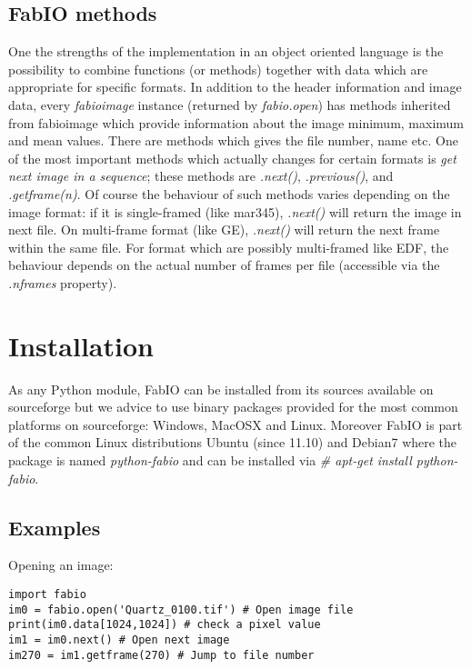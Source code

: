 \documentclass[preprint ]{iucr}
\begin{document}
\subsection{FabIO methods}



One the strengths of the implementation in an object oriented language
is the possibility to combine functions (or methods) together with data which
are appropriate for specific formats.
In addition to the header information and image data, every {\em fabioimage}
instance (returned by {\em fabio.open}) has methods inherited from fabioimage 
which provide information about the image minimum, maximum and mean values.
There are methods which gives the file number, name etc. One of the most
important methods which actually changes for certain formats  is {\em get next image
in a sequence}; these methods are {\em .next()}, {\em .previous()}, and {\em
.getframe(n)}. Of course the behaviour of such methods varies depending on the
image format: if it is single-framed (like mar345),  {\em .next()} will
return the image in next file. On multi-frame format (like GE), {\em .next()} will
return the next frame within the same file. For format which are possibly multi-framed like
EDF, the behaviour depends on the actual number of frames per file (accessible
via the {\em .nframes} property).


\section{Installation}

As any Python module, FabIO can be installed from its sources available on 
sourceforge \cite{fabio} but we advice to use binary packages provided for the
most common platforms on sourceforge: Windows, MacOSX and Linux.
Moreover FabIO is part of the common Linux distributions Ubuntu (since 11.10)
and Debian7 where the package is named {\em python-fabio} and can be installed
via {\em \# apt-get install python-fabio}. 

\subsection{Examples}

Opening an image:

\begin{verbatim}
import fabio     
im0 = fabio.open('Quartz_0100.tif') # Open image file
print(im0.data[1024,1024]) # check a pixel value
im1 = im0.next() # Open next image
im270 = im1.getframe(270) # Jump to file number
\end{verbatim}
\end{document}

